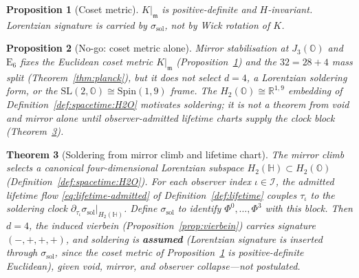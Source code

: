 \documentclass[aps,prd,onecolumn,amsmath,amssymb,nofootinbib,11pt]{revtex4-2}
\numberwithin{equation}{section}
\theoremstyle{plain}
\newtheorem{theorem}{Theorem}[section]
\newtheorem{proposition}[theorem]{Proposition}
\theoremstyle{definition}
\theoremstyle{remark}
\newcommand{\R}{\mathbb{R}}
\newcommand{\Quat}{\mathbb{H}}
\newcommand{\Oct}{\mathbb{O}}
\newcommand{\jalg}{J_3(\mathbb{O})}
\newcommand{\E}[1]{\mathrm{E}_{#1}}
\newcommand{\Spin}{\mathrm{Spin}}
\newcommand{\orderparam}{\Phi}
\begin{document}
\begin{proposition}[Coset metric]\label{prop:coset-metric}
$K|_{\mathfrak{m}}$ is positive-definite and $H$-invariant. Lorentzian
signature is carried by $\sigma_{\mathrm{sol}}$, not by Wick rotation of $K$.
\end{proposition}

\begin{proposition}[No-go: coset metric alone]\label{prop:coset-nogo}
Mirror stabilisation at $\jalg$ and $\E{6}$ fixes the \emph{Euclidean}
coset metric $K|_{\mathfrak{m}}$ (Proposition~\ref{prop:coset-metric}) and
the $32=28+4$ mass split (Theorem~\ref{thm:planck}), but it does \emph{not}
select $d=4$, a Lorentzian soldering form, or the
$\mathrm{SL}(2,\Oct)\cong\Spin(1,9)$ frame. The $H_2(\Oct)\cong\R^{1,9}$
embedding of Definition~\ref{def:spacetime:H2O} motivates soldering; it is
not a theorem from void and mirror alone until observer-admitted lifetime
charts supply the clock block (Theorem~\ref{thm:spacetime:soldering-derived}).
\end{proposition}

\begin{theorem}[Soldering from mirror climb and lifetime chart]
\label{thm:spacetime:soldering-derived}
The mirror climb selects a canonical four-dimensional Lorentzian subspace
$H_2(\Quat)\subset H_2(\Oct)$ (Definition~\ref{def:spacetime:H2O}). For each
observer index $\iota\in\mathcal{I}$, the admitted lifetime flow
\eqref{eq:lifetime-admitted} of Definition~\ref{def:lifetime} couples
$\tau_\iota$ to the soldering clock
$\partial_{\tau_\iota}\sigma_{\mathrm{sol}}|_{H_2(\Quat)}$. Define
$\sigma_{\mathrm{sol}}$ to identify
$\orderparam^0,\ldots,\orderparam^3$ with this block. Then $d=4$, the
induced vierbein (Proposition~\ref{prop:vierbein}) carries signature
$(-,+,+,+)$, and soldering is \textbf{assumed} (Lorentzian signature is inserted through $\sigma_{\mathrm{sol}}$, since the coset metric of Proposition~\ref{prop:coset-metric} is positive-definite Euclidean), given void, mirror, and
observer collapse---not postulated.
\end{theorem}
\end{document}
